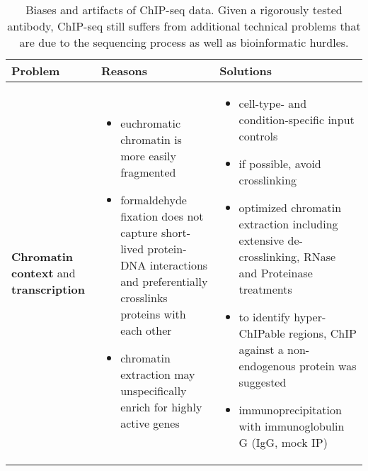 \noindent\begin{minipage}{\textwidth} %
\begin{singlespacing}
\begin{small}
\vspace*{-2em}
\begin{longtable}{>{\textsf\bgroup\raggedleft\arraybackslash}p{3cm}<{\egroup} >{\textsf\bgroup}p{5cm}<{\egroup} >{\textsf\bgroup}p{6cm}<{\egroup}} %
\caption[Biases and artifacts of ChIP-seq data.]{\textsf{Biases and artifacts of ChIP-seq data. Given a rigorously tested antibody, ChIP-seq still suffers from additional technical problems that are due to the sequencing process as well as bioinformatic hurdles.}} \\ %
\textbf{Problem} & \textbf{Reasons} & \textbf{Solutions}
\tabularnewline
\toprule
\begin{minipage}{3cm}
					\textbf{Chromatin context} and \textbf{transcription}
			\end{minipage}
			&	\begin{minipage}{5cm}
				\begin{itemize}[noitemsep,leftmargin=*]
					\item euchromatic chromatin is more easily fragmented
					\item formaldehyde fixation does not capture short-lived protein-DNA interactions \citep{Gavrilov2014} and pref\-er\-en\-tially cross\-links proteins with each other \citep{Neill2003}
					\item chromatin extraction may unspecifically enrich for highly active genes \citep{Teytelman2013}
				
				\end{itemize}
			\end{minipage}
			& \begin{minipage}{6cm}
				\vskip 6pt
					\begin{itemize}[noitemsep,leftmargin=*]
						\item cell-type- and condition-specific input controls \citep{Vega2009, Landt2012}
						\item if possible, avoid crosslinking \citep{Neill2003, Kasinathan2014}
						\item optimized chromatin extraction including extensive de-crosslinking, RNase and Proteinase treatments \cite{Waldminghaus2010}
						\item to identify hyper-ChIPable regions, ChIP against a non-endogenous protein was suggested \citep{Teytelman2013}
						\item immunoprecipitation with immunoglobulin G (IgG, mock IP) \citep{Landt2012,Marinov2014}
						

\end{itemize}
\end{minipage}
\end{longtable}
\end{small}
\end{singlespacing}
\end{minipage}
